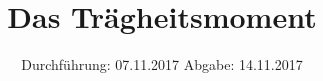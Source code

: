 

\subject{V-101}
\title{Das Trägheitsmoment}
\date{%
  Durchführung: 07.11.2017
  \hspace{3em}
  Abgabe: 14.11.2017
}



\maketitle
\thispagestyle{empty}
\tableofcontents
\newpage







\printbibliography{}


